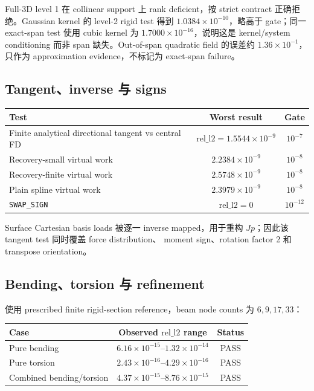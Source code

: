 \documentclass[11pt,a4paper]{article}
\newcommand{\relLtwo}{\mathrm{rel\_l2}}
\begin{document}
Full-3D level 1 在 collinear support 上 rank deficient，按 strict
contract 正确拒绝。Gaussian kernel 的 level-2 rigid test 得到
$1.0384\times10^{-10}$，略高于 gate；同一 exact-span test 使用
cubic kernel 为 $1.7000\times10^{-16}$，说明这是 kernel/system
conditioning 而非 span 缺失。Out-of-span quadratic field 的误差约
$1.36\times10^{-1}$，只作为 approximation evidence，不标记为
exact-span failure。

\subsection{Tangent、inverse 与 signs}

\begin{center}
\begin{tabular}{lcc}
\toprule
Test & Worst result & Gate\\
\midrule
Finite analytical directional tangent vs central FD
  & $\relLtwo=1.5544\times10^{-9}$ & $10^{-7}$\\
Recovery-small virtual work & $2.2384\times10^{-9}$ & $10^{-8}$\\
Recovery-finite virtual work & $2.5748\times10^{-9}$ & $10^{-8}$\\
Plain spline virtual work & $2.3979\times10^{-9}$ & $10^{-8}$\\
\texttt{SWAP\_SIGN} & $\relLtwo=0$ & $10^{-12}$\\
\bottomrule
\end{tabular}
\end{center}

Surface Cartesian basis loads 被逐一 inverse mapped，用于重构
$Jp$；因此该 tangent test 同时覆盖 force distribution、
moment sign、rotation factor 2 和 transpose orientation。

\subsection{Bending、torsion 与 refinement}

使用 prescribed finite rigid-section reference，beam node counts 为
$6,9,17,33$：
\begin{center}
\begin{tabular}{lcc}
\toprule
Case & Observed $\relLtwo$ range & Status\\
\midrule
Pure bending & $6.16\times10^{-15}$--$1.32\times10^{-14}$ & PASS\\
Pure torsion & $2.43\times10^{-16}$--$4.29\times10^{-16}$ & PASS\\
Combined bending/torsion & $4.37\times10^{-15}$--$8.76\times10^{-15}$ & PASS\\
\bottomrule
\end{tabular}
\end{center}
\end{document}
